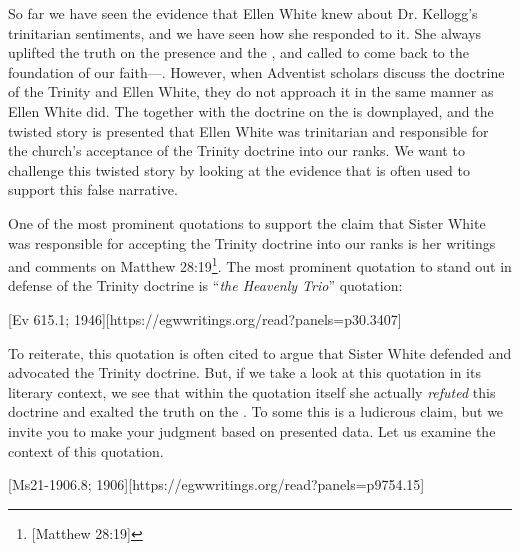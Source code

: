 
So far we have seen the evidence that Ellen White knew about Dr. Kellogg's trinitarian sentiments, and we have seen how she responded to it. She always uplifted the truth on the presence and the , and called to come back to the foundation of our faith—. However, when Adventist scholars discuss the doctrine of the Trinity and Ellen White, they do not approach it in the same manner as Ellen White did. The  together with the doctrine on the  is downplayed, and the twisted story is presented that Ellen White was trinitarian and responsible for the church's acceptance of the Trinity doctrine into our ranks. We want to challenge this twisted story by looking at the evidence that is often used to support this false narrative.

One of the most prominent quotations to support the claim that Sister White was responsible for accepting the Trinity doctrine into our ranks is her writings and comments on Matthew 28:19\footnote{[Matthew 28:19]}. The most prominent quotation to stand out in defense of the Trinity doctrine is “\textit{the Heavenly Trio}” quotation:

[Ev 615.1; 1946][https://egwwritings.org/read?panels=p30.3407]

To reiterate, this quotation is often cited to argue that Sister White defended and advocated the Trinity doctrine. But, if we take a look at this quotation in its literary context, we see that within the quotation itself she actually \textit{refuted} this doctrine and exalted the truth on the . To some this is a ludicrous claim, but we invite you to make your judgment based on presented data. Let us examine the context of this quotation.

[Ms21-1906.8; 1906][https://egwwritings.org/read?panels=p9754.15]

